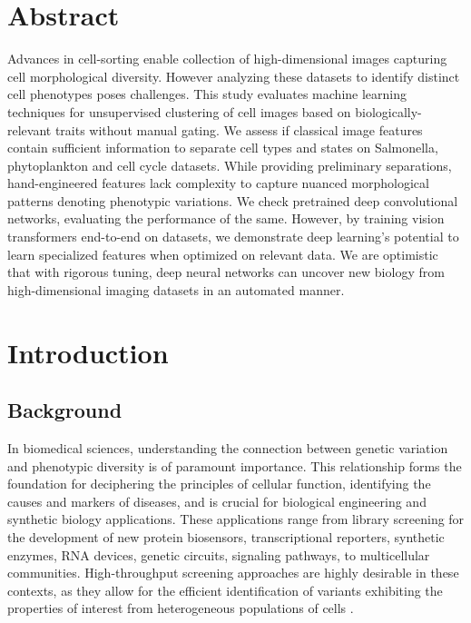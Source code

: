 \documentclass[12pt,a4paper]{article}
\begin{document}
\newpage



\section{Abstract}
\label{Abstract}


Advances in cell-sorting enable collection of high-dimensional images capturing cell morphological diversity. However analyzing these datasets to identify distinct cell phenotypes poses challenges. This study evaluates machine learning techniques for unsupervised clustering of cell images based on biologically-relevant traits without manual gating. We assess if classical image features contain sufficient information to separate cell types and states on Salmonella, phytoplankton and cell cycle datasets. While providing preliminary separations, hand-engineered features lack complexity to capture nuanced morphological patterns denoting phenotypic variations. We check pretrained deep convolutional networks, evaluating the performance of the same. However, by training vision transformers end-to-end on datasets, we demonstrate deep learning's potential to learn specialized features when optimized on relevant data. We are optimistic that with rigorous tuning, deep neural networks can uncover new biology from high-dimensional imaging datasets in an automated manner.
    
\section{Introduction}
\label{intro}

\subsection{Background}

In biomedical sciences, understanding the connection between genetic variation and phenotypic diversity is of paramount importance. This relationship forms the foundation for deciphering the principles of cellular function, identifying the causes and markers of diseases, and is crucial for biological engineering and synthetic biology applications. These applications range from library screening for the development of new protein biosensors, transcriptional reporters, synthetic enzymes, RNA devices, genetic circuits, signaling pathways, to multicellular communities. High-throughput screening approaches are highly desirable in these contexts, as they allow for the efficient identification of variants exhibiting the properties of interest from heterogeneous populations of cells \cite{Pegoraro2017-rs}.
\end{document}
